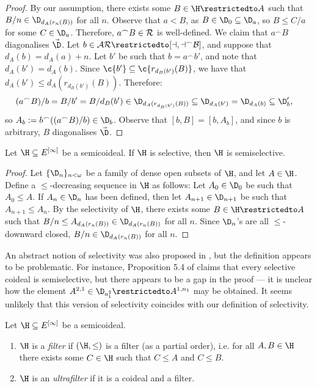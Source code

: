 \documentclass[11pt,reqno]{amsart}
\begin{document}
\begin{proof}
    By our assumption, there exists some $B \in \H\restrictedto A$ such that $B/n \in \D_{d_A(r_n(B))}$ for all $n$. Observe that $a < B$, as $B \in \D_0 \subseteq \D_a$, so $B \leq C/a$ for some $C \in \D_a$. Therefore, $a^\frown B \in \cal{R}$ is well-defined. We claim that $a^\frown B$ diagonalises $\vec{\D}$. Let $b \in \cal{AR}\restrictedto[a,a^\frown B]$, and suppose that $d_A(b) = d_A(a) + n$. Let $b'$ be such that $b = a^\frown b'$, and note that $d_A(b') = d_A(b)$. Since $\c{b'} \subseteq \c{r_{d_B(b')}(B)}$, we have that $d_A(b') \leq d_A(r_{d_B(b')}(B))$. Therefore:
    \begin{align*}
        (a^\frown B)/b &= B/b' = B/d_B(b') \in \D_{d_A(r_{d_B(b')}(B))} \subseteq \D_{d_A(b')} = \D_{d_A(b)} \subseteq \D_b',
    \end{align*}
    so $A_b := b^\frown((a^\frown B)/b) \in \D_b$. Observe that $[b,B] = [b,A_b]$, and since $b$ is arbitrary, $B$ diagonalises $\vec{\D}$.
\end{proof}

\begin{lemma}
    Let $\H \subseteq E^{[\infty]}$ be a semicoideal. If $\H$ is selective, then $\H$ is semiselective.
\end{lemma}

\begin{proof}
    Let $\{\D_n\}_{n<\omega}$ be a family of dense open subsets of $\H$, and let $A \in \H$. Define a $\leq$-decreasing sequence in $\H$ as follows: Let $A_0 \in \D_0$ be such that $A_0 \leq A$. If $A_n \in \D_n$ has been defined, then let $A_{n+1} \in \D_{n+1}$ be such that $A_{n+1} \leq A_n$. By the selectivity of $\H$, there exists some $B \in \H\restrictedto A$ such that $B/n \leq A_{d_A(r_n(B))} \in \D_{d_A(r_n(B))}$ for all $n$. Since $\D_n$'s are all $\leq$-downward closed, $B/n \in \D_{d_A(r_n(B))}$ for all $n$.
\end{proof}

An abstract notion of selectivity was also proposed in \cite{DMN15}, but the definition appears to be problematic. For instance, Proposition 5.4 of \cite{DMN15} claims that every selective coideal is semiselective, but there appears to be a gap in the proof --- it is unclear how the element $A^{2,1} \in \D_{a_1^2}\restrictedto A^{1,n_1}$ may be obtained. It seems unlikely that this version of selectivity coincides with our definition of selectivity.

\begin{definition}
\label{def:filter}
    Let $\H \subseteq E^{[\infty]}$ be a semicoideal. 
    \begin{enumerate}
        \item $\H$ is a \emph{filter} if $(\H,\leq)$ is a filter (as a partial order), i.e. for all $A,B \in \H$ there exists some $C \in \H$ such that $C \leq A$ and $C \leq B$. 
            
        \item $\H$ is an \emph{ultrafilter} if it is a coideal and a filter.
    \end{enumerate}
\end{definition}
\end{document}
